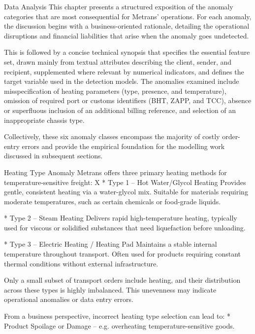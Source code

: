 \chap Data Analysis
This chapter presents a structured exposition of the anomaly categories that are most consequential for Metrans’ operations. For each anomaly, the discussion begins with a business-oriented rationale, detailing the operational disruptions and financial liabilities that arise when the anomaly goes undetected.

This is followed by a concise technical synopsis that specifies the essential feature set, drawn mainly from textual attributes describing the client, sender, and recipient, supplemented where relevant by numerical indicators, and defines the target variable used in the detection models. The anomalies examined include misspecification of heating parameters (type, presence, and temperature), omission of required port or customs identifiers (BHT, ZAPP, and TCC), absence or superfluous inclusion of an additional billing reference, and selection of an inappropriate chassis type. 

Collectively, these six anomaly classes encompass the majority of costly order-entry errors and provide the empirical foundation for the modelling work discussed in subsequent sections.

 
\sec Heating Type Anomaly
Metrans offers three primary heating methods for temperature-sensitive freight:
\begitems \style X
 * Type 1 – Hot Water/Glycol Heating
Provides gentle, consistent heating via a water-glycol mix. Suitable for materials requiring moderate temperatures, such as certain chemicals or food-grade liquids.

* Type 2 – Steam Heating
Delivers rapid high-temperature heating, typically used for viscous or solidified substances that need liquefaction before unloading.

* Type 3 – Electric Heating / Heating Pad
Maintains a stable internal temperature throughout transport. Often used for products requiring constant thermal conditions without external infrastructure.
\enditems

Only a small subset of transport orders include heating, and their distribution across these types is highly imbalanced. This unevenness may indicate operational anomalies or data entry errors.

From a business perspective, incorrect heating type selection can lead to:
\begitems
* Product Spoilage or Damage – e.g. overheating temperature-sensitive goods.

